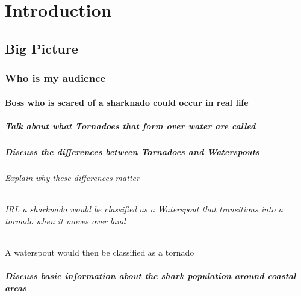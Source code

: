 \documentclass[
  letterpaper,
  DIV=11,
  numbers=noendperiod]{scrreprt}
\let\oldparagraph\paragraph
\renewcommand{\paragraph}[1]{\oldparagraph{#1}\mbox{}}
\let\oldsubparagraph\subparagraph
\renewcommand{\subparagraph}[1]{\oldsubparagraph{#1}\mbox{}}
\begin{document}

\chapter{Introduction}\label{introduction}

\section{Big Picture}\label{big-picture}

\subsection{Who is my audience}\label{who-is-my-audience}

\subsubsection{Boss who is scared of a sharknado could occur in real
life}\label{boss-who-is-scared-of-a-sharknado-could-occur-in-real-life}

\paragraph{Talk about what Tornadoes that form over water are
called}\label{talk-about-what-tornadoes-that-form-over-water-are-called}

\paragraph{Discuss the differences between Tornadoes and
Waterspouts}\label{discuss-the-differences-between-tornadoes-and-waterspouts}

\subparagraph{Explain why these differences
matter}\label{explain-why-these-differences-matter}

\subparagraph{IRL a sharknado would be classified as a Waterspout that
transitions into a tornado when it moves over
land}\label{irl-a-sharknado-would-be-classified-as-a-waterspout-that-transitions-into-a-tornado-when-it-moves-over-land}

A waterspout would then be classified as a tornado

\paragraph{Discuss basic information about the shark population around
coastal
areas}\label{discuss-basic-information-about-the-shark-population-around-coastal-areas}
\end{document}
